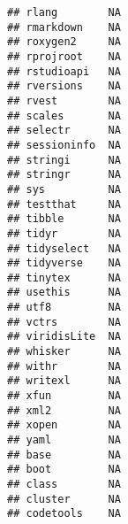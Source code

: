 \documentclass[]{book}
\begin{document}
\begin{verbatim}
## rlang        NA                                                        
## rmarkdown    NA                                                        
## roxygen2     NA                                                        
## rprojroot    NA                                                        
## rstudioapi   NA                                                        
## rversions    NA                                                        
## rvest        NA                                                        
## scales       NA                                                        
## selectr      NA                                                        
## sessioninfo  NA                                                        
## stringi      NA                                                        
## stringr      NA                                                        
## sys          NA                                                        
## testthat     NA                                                        
## tibble       NA                                                        
## tidyr        NA                                                        
## tidyselect   NA                                                        
## tidyverse    NA                                                        
## tinytex      NA                                                        
## usethis      NA                                                        
## utf8         NA                                                        
## vctrs        NA                                                        
## viridisLite  NA                                                        
## whisker      NA                                                        
## withr        NA                                                        
## writexl      NA                                                        
## xfun         NA                                                        
## xml2         NA                                                        
## xopen        NA                                                        
## yaml         NA                                                        
## base         NA                                                        
## boot         NA                                                        
## class        NA                                                        
## cluster      NA                                                        
## codetools    NA                                                        

\end{verbatim}
\end{document}

